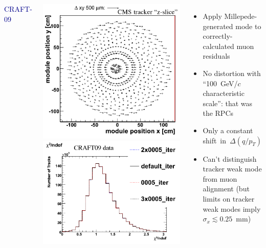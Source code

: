 \documentclass[compress]{beamer}
\begin{document}
\begin{frame}
\begin{columns}
\vspace{-1 cm}
\hfill \textcolor{darkblue}{\scriptsize \mbox{CRAFT-09\hspace{-1.2 cm}}}

\vspace{0.5 cm}


\includegraphics[width=0.5\linewidth]{stoye_deformation.png}
\includegraphics[width=0.5\linewidth]{chi2_invariance.png}

\begin{itemize}
\item Apply Millepede-generated mode to correctly-calculated muon residuals

\item No distortion with ``100~GeV/$c$ characteristic scale'': that was the RPCs

\item Only a constant \mbox{shift in $\Delta(q/p_T)$\hspace{-1 cm}}

\item Can't distinguish tracker weak mode from muon alignment (but limits on tracker weak modes imply $\sigma_x \lesssim 0.25$~mm)
\end{itemize}
\end{columns}
\end{frame}
\end{document}
